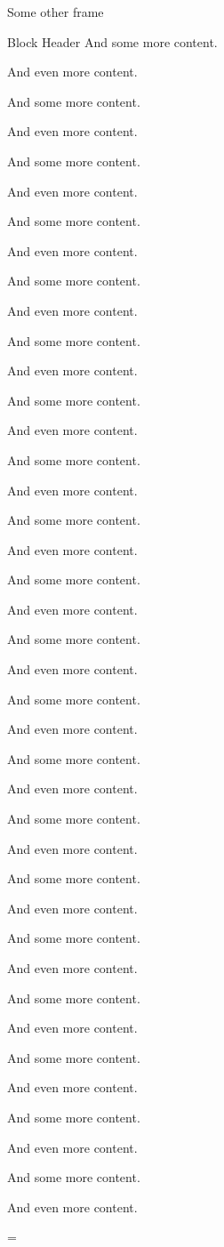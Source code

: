 \documentclass[t]{beamer}
\begin{document}
\begin{refsection}
\begin{frame}{Some other frame}
\begin{block}{Block Header}
And some more content.

And even more content.

And some more content.

And even more content.

And some more content.

And even more content.

And some more content.

And even more content.

And some more content.

And even more content.

And some more content.

And even more content.

And some more content.

And even more content.

And some more content.

And even more content.

And some more content.

And even more content.

And some more content.

And even more content.

And some more content.

And even more content.

And some more content.

And even more content.

And some more content.

And even more content.

And some more content.

And even more content.

And some more content.

And even more content.

And some more content.

And even more content.

And some more content.

And even more content.

And some more content.

And even more content.

And some more content.

And even more content.


And some more content.

And even more content.
\end{block}
\end{frame}

\end{refsection}

\begin{frame}
=\hbox{\bibliofinale}
\printbibliography
\end{frame}
\end{document}
